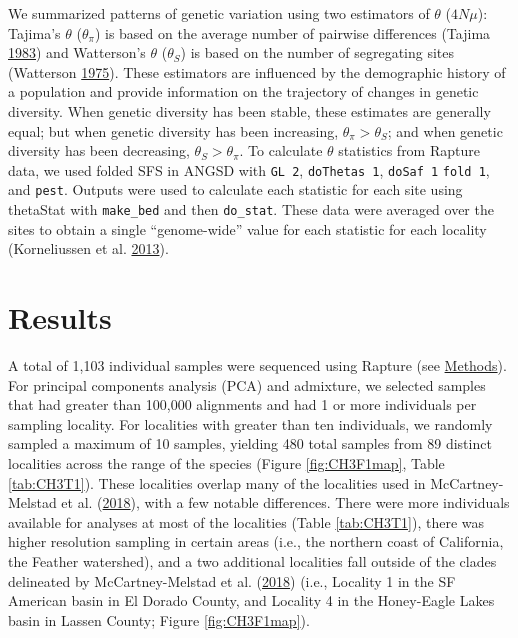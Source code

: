 \documentclass[proquest,12pt,final]{ucthesis-CA2012} %
\begin{document}
\begin{ucmainmatter}
We summarized patterns of genetic variation using two estimators of
\(\theta\) (\(4N\mu\)): Tajima's \(\theta\) (\(\theta_\pi\)) is based on
the average number of pairwise differences (Tajima
\protect\hyperlink{ref-tajima_evolutionary_1983}{1983}) and Watterson's
\(\theta\) (\(\theta_S\)) is based on the number of segregating sites
(Watterson \protect\hyperlink{ref-watterson_number_1975}{1975}). These
estimators are influenced by the demographic history of a population and
provide information on the trajectory of changes in genetic diversity.
When genetic diversity has been stable, these estimates are generally
equal; but when genetic diversity has been increasing,
\(\theta_\pi > \theta_S\); and when genetic diversity has been
decreasing, \(\theta_S > \theta_\pi\). To calculate \(\theta\)
statistics from Rapture data, we used folded SFS in ANGSD with
\texttt{GL\ 2}, \texttt{doThetas\ 1}, \texttt{doSaf\ 1}
\texttt{fold\ 1}, and \texttt{pest}. Outputs were used to calculate each
statistic for each site using thetaStat with \texttt{make\_bed} and then
\texttt{do\_stat}. These data were averaged over the sites to obtain a
single ``genome-wide'' value for each statistic for each locality
(Korneliussen et al.
\protect\hyperlink{ref-korneliussen_calculation_2013}{2013}).

\hypertarget{results-2}{%
\section{Results}\label{results-2}}

A total of 1,103 individual samples were sequenced using Rapture (see
\protect\hyperlink{ch3rapture}{Methods}). For principal components
analysis (PCA) and admixture, we selected samples that had greater than
100,000 alignments and had 1 or more individuals per sampling locality.
For localities with greater than ten individuals, we randomly sampled a
maximum of 10 samples, yielding 480 total samples from 89 distinct
localities across the range of the species (Figure \ref{fig:CH3F1map},
Table \ref{tab:CH3T1}). These localities overlap many of the localities
used in McCartney-Melstad et al.
(\protect\hyperlink{ref-mccartney-melstad_population_2018}{2018}), with
a few notable differences. There were more individuals available for
analyses at most of the localities (Table \ref{tab:CH3T1}), there was
higher resolution sampling in certain areas (i.e., the northern coast of
California, the Feather watershed), and a two additional localities fall
outside of the clades delineated by McCartney-Melstad et al.
(\protect\hyperlink{ref-mccartney-melstad_population_2018}{2018}) (i.e.,
Locality 1 in the SF American basin in El Dorado County, and Locality 4
in the Honey-Eagle Lakes basin in Lassen County; Figure
\ref{fig:CH3F1map}).










\end{ucmainmatter}
\end{document}

